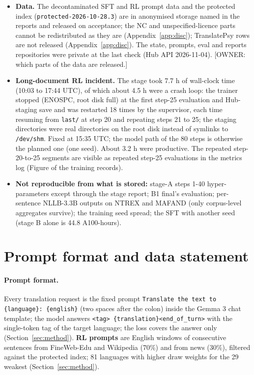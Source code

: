 \begin{itemize}
\item \textbf{Data.} The decontaminated SFT and RL prompt data and the protected index (\texttt{protected-\allowbreak{}2026-\allowbreak{}10-\allowbreak{}28.\allowbreak{}3}) are in anonymised storage named in the reports and released on acceptance; the NC and unspecified-licence parts cannot be redistributed as they are (Appendix~\ref{app:disc}); TranslatePsy rows are not released (Appendix~\ref{app:disc}). The state, prompts, eval and reports repositories were private at the last check (Hub API 2026-11-04). [OWNER: which parts of the data are released.]
\item \textbf{Long-document RL incident.} The stage took 7.7 h of wall-clock time (10:03 to 17:44 UTC), of which about 4.5 h were a crash loop: the trainer stopped (ENOSPC, root disk full) at the first step-25 evaluation and Hub-staging save and was restarted 18 times by the supervisor, each time resuming from \texttt{last/\allowbreak{}} at step 20 and repeating steps 21 to 25; the staging directories were real directories on the root disk instead of symlinks to \texttt{/\allowbreak{}dev/\allowbreak{}shm}. Fixed at 15:35 UTC; the model path of the 80 steps is otherwise the planned one (one seed). About 3.2 h were productive. The repeated step-20-to-25 segments are visible as repeated step-25 evaluations in the metrics log (Figure of the training records). 
\item \textbf{Not reproducible from what is stored:} stage-A steps 1-40 hyper-parameters except through the stage report; B1 final's evaluation; per-sentence NLLB-3.3B outputs on NTREX and MAFAND (only corpus-level aggregates survive); the training seed spread; the SFT with another seed (stage B alone is 44.8 A100-hours).
\end{itemize}

\section{Prompt format and data statement}\label{app:format}

\paragraph{Prompt format.} Every translation request is the fixed prompt \texttt{Translate the text to \{language\}:  \{english\}} (two spaces after the colon) inside the Gemma 3 chat template; the model answers \texttt{<tag> \{translation\}<end\_of\_turn>} with the single-token tag of the target language; the loss covers the answer only (Section~\ref{sec:method}). \textbf{RL prompts} are English windows of consecutive sentences from FineWeb-Edu and Wikipedia (70\%) and from news (30\%), filtered against the protected index; 81 languages with higher draw weights for the 29 weakest (Section~\ref{sec:method}).

